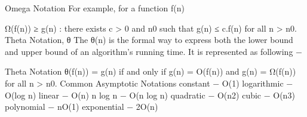 \begin{frame}
Omega Notation
For example, for a function f(n)

Ω(f(n)) ≥ { g(n) : there exists c > 0 and n0 such that g(n) ≤ c.f(n) for all n > n0. }
Theta Notation, θ
The θ(n) is the formal way to express both the lower bound and upper bound of an algorithm's running time. It is represented as following −
\end{frame}
\begin{frame}
Theta Notation
θ(f(n)) = { g(n) if and only if g(n) =  Ο(f(n)) and g(n) = Ω(f(n)) for all n > n0. }
Common Asymptotic Notations
constant	−	Ο(1)
logarithmic	−	Ο(log n)
linear	−	Ο(n)
n log n	−	Ο(n log n)
quadratic	−	Ο(n2)
cubic	−	Ο(n3)
polynomial	−	nΟ(1)
exponential	−	2Ο(n)

\end{frame}
